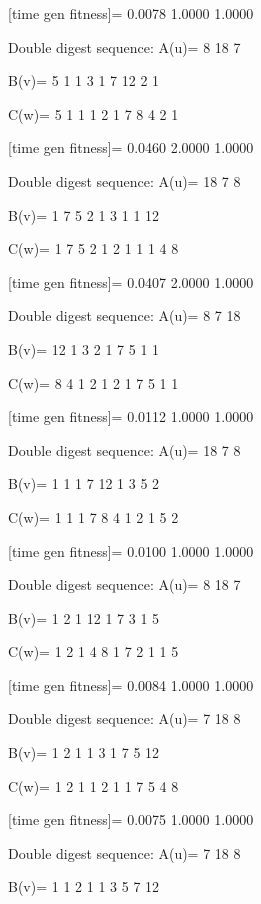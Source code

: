 [time gen fitness]=
    0.0078    1.0000    1.0000

Double digest sequence:
A(u)=
     8    18     7

B(v)=
     5     1     1     3     1     7    12     2     1

C(w)=
     5     1     1     1     2     1     7     8     4     2     1

[time gen fitness]=
    0.0460    2.0000    1.0000

Double digest sequence:
A(u)=
    18     7     8

B(v)=
     1     7     5     2     1     3     1     1    12

C(w)=
     1     7     5     2     1     2     1     1     1     4     8

[time gen fitness]=
    0.0407    2.0000    1.0000

Double digest sequence:
A(u)=
     8     7    18

B(v)=
    12     1     3     2     1     7     5     1     1

C(w)=
     8     4     1     2     1     2     1     7     5     1     1

[time gen fitness]=
    0.0112    1.0000    1.0000

Double digest sequence:
A(u)=
    18     7     8

B(v)=
     1     1     1     7    12     1     3     5     2

C(w)=
     1     1     1     7     8     4     1     2     1     5     2

[time gen fitness]=
    0.0100    1.0000    1.0000

Double digest sequence:
A(u)=
     8    18     7

B(v)=
     1     2     1    12     1     7     3     1     5

C(w)=
     1     2     1     4     8     1     7     2     1     1     5

[time gen fitness]=
    0.0084    1.0000    1.0000

Double digest sequence:
A(u)=
     7    18     8

B(v)=
     1     2     1     1     3     1     7     5    12

C(w)=
     1     2     1     1     2     1     1     7     5     4     8

[time gen fitness]=
    0.0075    1.0000    1.0000

Double digest sequence:
A(u)=
     7    18     8

B(v)=
     1     1     2     1     1     3     5     7    12

